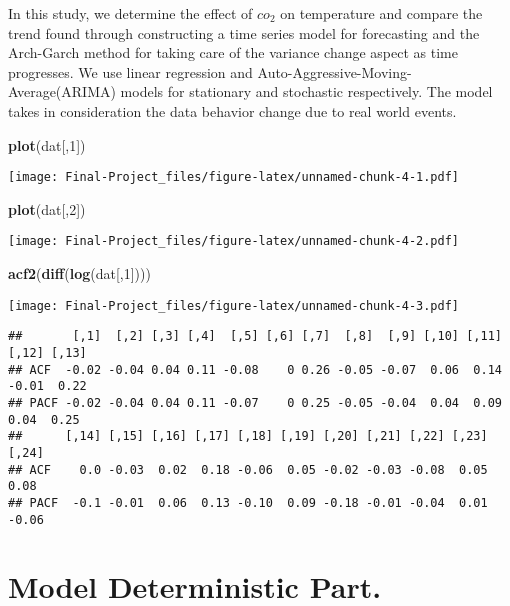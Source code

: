 \documentclass[
]{article}
\newenvironment{Shaded}{\begin{snugshade}}{\end{snugshade}}
\newcommand{\DecValTok}[1]{\textcolor[rgb]{0.00,0.00,0.81}{#1}}
\newcommand{\FunctionTok}[1]{\textcolor[rgb]{0.13,0.29,0.53}{\textbf{#1}}}
\newcommand{\NormalTok}[1]{#1}
\begin{document}
In this study, we determine the effect of \(co_2\) on temperature and
compare the trend found through constructing a time series model for
forecasting and the Arch-Garch method for taking care of the variance
change aspect as time progresses. We use linear regression and
Auto-Aggressive-Moving-Average(ARIMA) models for stationary and
stochastic respectively. The model takes in consideration the data
behavior change due to real world events.

\begin{Shaded}
\begin{Highlighting}[]
\FunctionTok{plot}\NormalTok{(dat[,}\DecValTok{1}\NormalTok{])}
\end{Highlighting}
\end{Shaded}

\texttt{[image: Final-Project\_files/figure-latex/unnamed-chunk-4-1.pdf]}

\begin{Shaded}
\begin{Highlighting}[]
\FunctionTok{plot}\NormalTok{(dat[,}\DecValTok{2}\NormalTok{])}
\end{Highlighting}
\end{Shaded}

\texttt{[image: Final-Project\_files/figure-latex/unnamed-chunk-4-2.pdf]}

\begin{Shaded}
\begin{Highlighting}[]
\FunctionTok{acf2}\NormalTok{(}\FunctionTok{diff}\NormalTok{(}\FunctionTok{log}\NormalTok{(dat[,}\DecValTok{1}\NormalTok{])))}
\end{Highlighting}
\end{Shaded}

\texttt{[image: Final-Project\_files/figure-latex/unnamed-chunk-4-3.pdf]}

\begin{verbatim}
##       [,1]  [,2] [,3] [,4]  [,5] [,6] [,7]  [,8]  [,9] [,10] [,11] [,12] [,13]
## ACF  -0.02 -0.04 0.04 0.11 -0.08    0 0.26 -0.05 -0.07  0.06  0.14 -0.01  0.22
## PACF -0.02 -0.04 0.04 0.11 -0.07    0 0.25 -0.05 -0.04  0.04  0.09  0.04  0.25
##      [,14] [,15] [,16] [,17] [,18] [,19] [,20] [,21] [,22] [,23] [,24]
## ACF    0.0 -0.03  0.02  0.18 -0.06  0.05 -0.02 -0.03 -0.08  0.05  0.08
## PACF  -0.1 -0.01  0.06  0.13 -0.10  0.09 -0.18 -0.01 -0.04  0.01 -0.06
\end{verbatim}

\hypertarget{model-deterministic-part.}{%
\section{Model Deterministic Part.}\label{model-deterministic-part.}}
\end{document}
